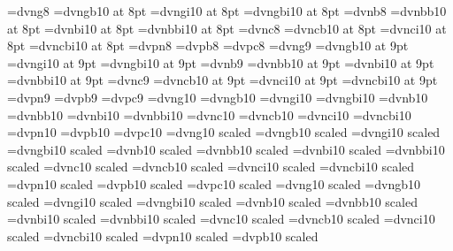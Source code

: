%
\def\dnhugetf{\ifdnpenfont\ifdnbombayfont\let\dntf=\bigdnpbom\else%
\ifdncalcuttafont\let\dntf=\bigdnpcal\else\let\dntf=\bigdnp\fi\fi%
\else\ifdnbombayfont\let\dntf=\bigdnbom\else%
\ifdncalcuttafont\let\dntf=\bigdncal\else\let\dntf=\bigdn\fi\fi\fi}
%
%
\font\smalldn=dvng8
\font\smalldnb=dvngb10 at 8pt
\font\smalldni=dvngi10 at 8pt
\font\smalldnbi=dvngbi10 at 8pt
\font\smalldnbom=dvnb8
\font\smalldnbomb=dvnbb10 at 8pt
\font\smalldnbomi=dvnbi10 at 8pt
\font\smalldnbombi=dvnbbi10 at 8pt
\font\smalldncal=dvnc8
\font\smalldncalb=dvncb10 at 8pt
\font\smalldncali=dvnci10 at 8pt
\font\smalldncalbi=dvncbi10 at 8pt
\font\smalldnp=dvpn8
\font\smalldnpbom=dvpb8
\font\smalldnpcal=dvpc8
\font\ninedn=dvng9
\font\ninednb=dvngb10 at 9pt
\font\ninedni=dvngi10 at 9pt
\font\ninednbi=dvngbi10 at 9pt
\font\ninednbom=dvnb9
\font\ninednbomb=dvnbb10 at 9pt
\font\ninednbomi=dvnbi10 at 9pt
\font\ninednbombi=dvnbbi10 at 9pt
\font\ninedncal=dvnc9
\font\ninedncalb=dvncb10 at 9pt
\font\ninedncali=dvnci10 at 9pt
\font\ninedncalbi=dvncbi10 at 9pt
\font\ninednp=dvpn9
\font\ninednpbom=dvpb9
\font\ninednpcal=dvpc9
\font\dvng=dvng10
\font\dvngb=dvngb10
\font\dvngi=dvngi10
\font\dvngbi=dvngbi10
\font\dvngbom=dvnb10
\font\dvngbomb=dvnbb10
\font\dvngbomi=dvnbi10
\font\dvngbombi=dvnbbi10
\font\dvngcal=dvnc10
\font\dvngcalb=dvncb10
\font\dvngcali=dvnci10
\font\dvngcalbi=dvncbi10
\font\dvngp=dvpn10
\font\dvngpbom=dvpb10
\font\dvngpcal=dvpc10
\font\halfdn=dvng10 scaled\magstephalf
\font\halfdnb=dvngb10 scaled\magstephalf
\font\halfdni=dvngi10 scaled\magstephalf
\font\halfdnbi=dvngbi10 scaled\magstephalf
\font\halfdnbom=dvnb10 scaled\magstephalf
\font\halfdnbomb=dvnbb10 scaled\magstephalf
\font\halfdnbomi=dvnbi10 scaled\magstephalf
\font\halfdnbombi=dvnbbi10 scaled\magstephalf
\font\halfdncal=dvnc10 scaled\magstephalf
\font\halfdncalb=dvncb10 scaled\magstephalf
\font\halfdncali=dvnci10 scaled\magstephalf
\font\halfdncalbi=dvncbi10 scaled\magstephalf
\font\halfdnp=dvpn10 scaled\magstephalf
\font\halfdnpbom=dvpb10 scaled\magstephalf
\font\halfdnpcal=dvpc10 scaled\magstephalf
\font\bigdn=dvng10 scaled
\font\bigdnb=dvngb10 scaled
\font\bigdni=dvngi10 scaled
\font\bigdnbi=dvngbi10 scaled
\font\bigdnbom=dvnb10 scaled
\font\bigdnbomb=dvnbb10 scaled
\font\bigdnbomi=dvnbi10 scaled
\font\bigdnbombi=dvnbbi10 scaled
\font\bigdncal=dvnc10 scaled
\font\bigdncalb=dvncb10 scaled
\font\bigdncali=dvnci10 scaled
\font\bigdncalbi=dvncbi10 scaled
\font\bigdnp=dvpn10 scaled
\font\bigdnpbom=dvpb10 scaled
